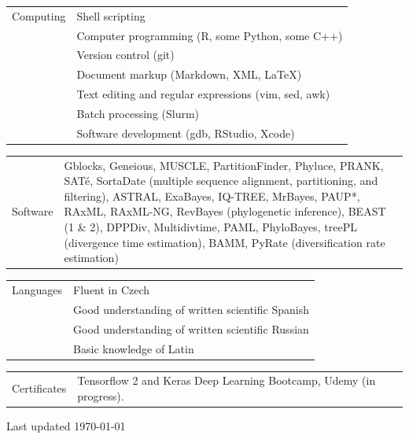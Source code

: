 \documentclass[10pt]{article}
\begin{document}
\begin{tabularx}{\textwidth}{>{\raggedleft\arraybackslash}p{2.2cm} X}
Computing & Shell scripting \\
& Computer programming (\textsf{R}, some \textsf{Python}, some \textsf{C++}) \\
& Version control (\textsf{git}) \\
& Document markup (Markdown, XML, \LaTeX) \\
& Text editing and regular expressions (\textsf{vim}, \textsf{sed}, \textsf{awk}) \\
& Batch processing (Slurm) \\
& Software development (\textsf{gdb}, RStudio, Xcode)
\end{tabularx}
\begin{tabularx}{\textwidth}{>{\raggedleft\arraybackslash}p{2.2cm} X}
Software & \textsf{Gblocks}, \textsf{Geneious}, \textsf{MUSCLE},  \textsf{PartitionFinder}, \textsf{Phyluce}, \textsf{PRANK}, \textsf{SAT\'{e}}, \textsf{SortaDate} (multiple sequence alignment, partitioning, and filtering), \textsf{ASTRAL}, \textsf{ExaBayes}, \textsf{IQ-TREE}, \textsf{MrBayes}, \textsf{PAUP*}, \textsf{RAxML}, \textsf{RAxML-NG}, \textsf{RevBayes} (phylogenetic inference), \textsf{BEAST (1 \& 2)}, \textsf{DPPDiv}, \textsf{Multidivtime}, \textsf{PAML}, \textsf{PhyloBayes}, \textsf{treePL} (divergence time estimation), \textsf{BAMM}, \textsf{PyRate} (diversification rate estimation)
\end{tabularx}
\begin{tabularx}{\textwidth}{>{\raggedleft\arraybackslash}p{2.2cm} X}
Languages & Fluent in Czech \\
& Good understanding of written scientific Spanish \\
& Good understanding of written scientific Russian \\
& Basic knowledge of Latin
\end{tabularx}
\begin{tabularx}{\textwidth}{>{\raggedleft\arraybackslash}p{2.2cm} X}
Certificates & Tensorflow 2 and Keras Deep Learning Bootcamp, Udemy (in progress).
\end{tabularx}

\vspace*{1cm}

\noindent \begin{minipage}{16.51cm}
\begin{center}
Last updated \today
\end{center}
\end{minipage}
\end{document}
